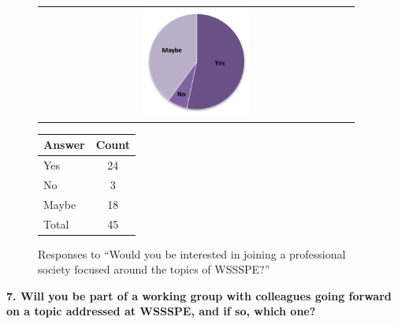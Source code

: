 \begin{figure}[h!]
    \centering
    \begin{tabular}{@{}c@{}}
        \includegraphics[width=0.35\textwidth]{figures/SurveyFig5rev}%
    \end{tabular}
    \qquad
    \begin{tabular}{@{}lc@{}}
    \toprule
    Answer & Count \\
    \midrule
    Yes & 24 \\
    No & 3 \\
    Maybe & 18 \\
    Total & 45 \\
    \bottomrule
    \end{tabular}
    \caption{Responses to ``Would you be interested in joining a professional
    society focused around the topics of WSSSPE?''}
    \label{fig:SFig5}
\end{figure}

%


\newpage
\noindent \textbf{7. Will you be part of a working group  with colleagues going forward  on a topic addressed at WSSSPE, and if so, which one?}

